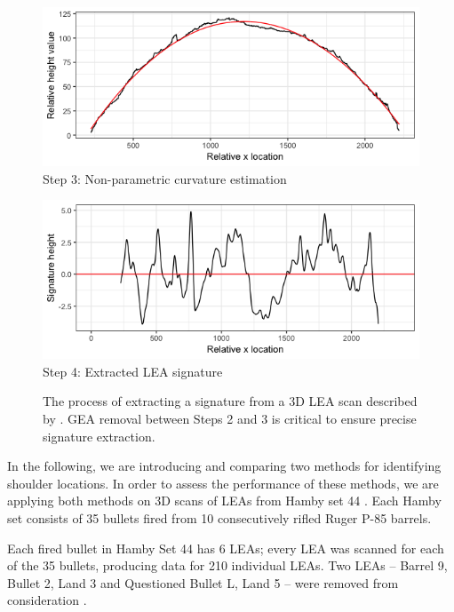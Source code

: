 \documentclass[12pt]{article}
\begin{document}
\begin{figure}
\vspace{.3cm}
\begin{minipage}[b]{0.45\linewidth}
    \raggedleft
    \includegraphics[width=\textwidth]{images/profile_paper_loess}
    \centering
    Step 3: Non-parametric curvature estimation
\end{minipage}
\hspace{.5cm}
\begin{minipage}[b]{0.45\linewidth}
    \raggedright
    \includegraphics[width=\textwidth]{images/signature_paper}
    \centering
    Step 4: Extracted LEA signature
\end{minipage}
\caption{The process of extracting a signature from a 3D LEA scan described by \cite{Hare1}. GEA removal between Steps 2 and 3 is critical to ensure precise signature extraction.}  
\label{fig:process}
\end{figure}

In the following, we are introducing and comparing two methods for
identifying shoulder locations. In order to assess the performance of
these methods, we are applying both methods on 3D scans of LEAs from
Hamby set 44 \citep{Hamby}. Each Hamby set consists of 35
{\color{teal}{Winchester 9mm copper}} bullets fired from 10
consecutively rifled Ruger P-85 {\color{teal}{9mm Luger}} barrels.

Each fired bullet in Hamby Set 44 has 6 LEAs; every LEA was scanned for
each of the 35 bullets, producing data for 210 individual LEAs. Two LEAs
-- Barrel 9, Bullet 2, Land 3 and Questioned Bullet L, Land 5 -- were
removed from consideration
{\color{teal}{because they were deemed unsuitable for comparison. These two LEAs contained significant abrasians created by contact with the bottom of a water recovery tank after exiting the barrel. These abrasians are thus marks present on the LEAs that are not due to contact with the barrel itself}}.
\end{document}
